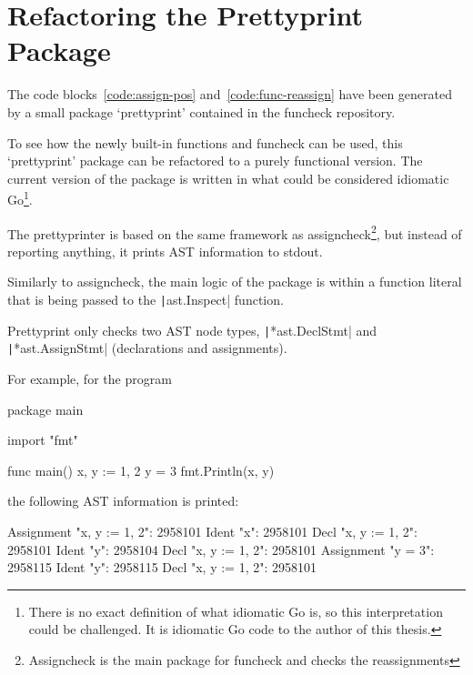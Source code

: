 
\section{Refactoring the Prettyprint Package}


The code blocks~\ref{code:assign-pos} and~\ref{code:func-reassign} have been
generated by a small package `prettyprint' contained in the funcheck repository.

To see how the newly built-in functions and funcheck can be used, this `prettyprint' package
can be refactored to a purely functional version.
The current version of the package is written in what could be considered idiomatic
Go\footnote{
	There is no exact definition of what idiomatic Go is, so this interpretation
	could be challenged. It is idiomatic Go code to the author of this thesis.
}. %


The prettyprinter is based on the same framework as assigncheck\footnote{Assigncheck
is the main package for funcheck and checks the reassignments}, but instead
of reporting anything, it prints AST information to \gls{stdout}.

Similarly to assigncheck, the main logic of the package is within a
function literal that is being passed to the \texttt|ast.Inspect|
function.

Prettyprint only checks two AST node types, \texttt|*ast.DeclStmt|
and \texttt|*ast.AssignStmt| (declarations and assignments).

For example, for the program
\begin{gocode}
package main

import "fmt"

func main() {
	x, y := 1, 2
	y = 3
	fmt.Println(x, y)
}
\end{gocode}
the following AST information is printed:

\begin{gocode}
Assignment "x, y := 1, 2": 2958101
		Ident "x": 2958101
				Decl "x, y := 1, 2": 2958101
		Ident "y": 2958104
				Decl "x, y := 1, 2": 2958101
Assignment "y = 3": 2958115
		Ident "y": 2958115
				Decl "x, y := 1, 2": 2958101
\end{gocode}

